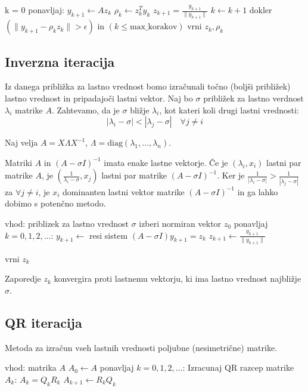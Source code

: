 \begin{multicols}{5}
\begin{koda}
k = 0
ponavljaj:
    $y_{k+1} \leftarrow A z_k$
    $\rho_k \leftarrow z_k^T y_k$
    $z_{k+1} = \frac{y_{k+1}}{\| y_{k+1} \|}$
    $k \leftarrow k + 1$
dokler $(\| y_{k+1} - \rho_k z_k \| > \epsilon )$ in $(k \leq \text{max\_korakov})$
vrni $z_k, \rho_k$
\end{koda}

\subsection*{Inverzna iteracija}
Iz danega približka za lastno vrednost bomo izračunali točno (boljši približek) lastno vrednost in pripadajoči lastni vektor.
Naj bo $\sigma$ približek za lastno verdnost $\lambda_i$ matrike $A$. Zahtevamo, da je $\sigma$ bližje $\lambda_i$, kot kateri koli drugi lastni vrednosti:
\[ |\lambda_i - \sigma | < |\lambda_j - \sigma| \quad \forall j \neq i\]

Naj velja $A = X \Lambda X^{-1}$, $\Lambda = \text{diag}(\lambda_1, \dots, \lambda_n)$.

Matriki $A$ in $(A-\sigma I)^{-1}$ imata enake lastne vektorje. Če je $(\lambda_i, x_i)$ lastni par matrike $A$, je $(\frac{1}{\lambda_i - \sigma}, x_j)$ lastni par matrike $(A-\sigma I)^{-1}$.
Ker je $\frac{1}{|\lambda_i - \sigma|} > \frac{1}{|\lambda_j - \sigma|}$ za $\forall j \neq i$, je $x_i$ dominanten lastni vektor matrike $(A-\sigma I)^{-1}$ in ga lahko dobimo s potenčno metodo.
%

\begin{koda}
vhod: priblizek za lastno vrednost $\sigma$
izberi normiran vektor $z_0$
ponavljaj $k=0, 1, 2, \dots$:
    $y_{k+1} \leftarrow $ resi sistem $(A-\sigma I) y_{k+1} = z_k$
    $z_{k+1} \leftarrow \frac{y_{k+1}}{\| y_{k+1} \|}$

vrni $z_k$
\end{koda}

Zaporedje $z_k$ konvergira proti lastnemu vektorju, ki ima lastno vrednost najbližje $\sigma$.


\subsection*{QR iteracija}
Metoda za izračun vseh lastnih vrednosti poljubne (nesimetrične) matrike.

\begin{koda}
vhod: matrika $A$
$A_0 \leftarrow A$
ponavljaj $k = 0, 1, 2, \dots$:
    Izracunaj QR razcep matrike $A_k$: $A_k = Q_k R_k$
    $A_{k+1} \leftarrow R_k Q_k$
\end{koda}


\end{multicols}
